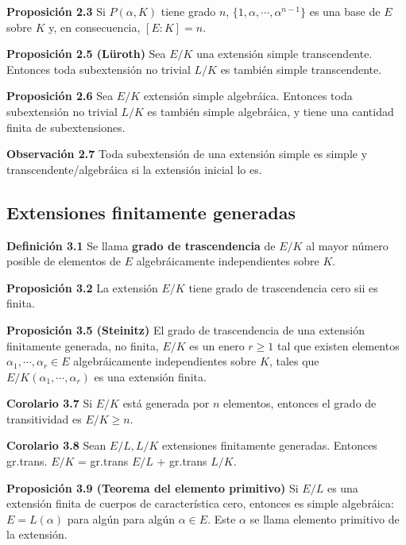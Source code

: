 \documentclass[a4paper, 11pt]{extarticle}
\newcommand{\propo}[1]{\textcolor{rojo}{\textbf{Proposición #1}}}
\newcommand{\defi}[1]{\textcolor{azul}{\textbf{Definición #1}}}
\newcommand{\obs}[1]{\textcolor{verde}{\textbf{Observación #1}}}
\newcommand{\cor}[1]{\textcolor{rosa}{\textbf{Corolario #1}}}
\begin{document}
\begin{multicols*}{2}
\propo{2.3} Si \(P(\alpha,K)\) tiene grado \(n\), \(\{ 1, \alpha, \cdots,
\alpha^{n-1} \}\) es una base de \(E\) sobre \(K\) y, en consecuencia, \([E:K] = n\).

\propo{2.5 (Lüroth)} Sea \(E/K\) una extensión simple transcendente. Entonces
toda subextensión no trivial \(L/K\) es también simple transcendente. 

\propo{2.6} Sea \(E/K\) extensión simple algebráica. Entonces toda
subextensión no trivial \(L/K\) es también simple algebráica, y tiene una
cantidad finita de subextensiones.

\obs{2.7} Toda subextensión de una extensión simple es simple y
transcendente/algebráica si la extensión inicial lo es.

\subsection*{Extensiones finitamente generadas}
\label{sec:orgead2c48}
\defi{3.1} Se llama \textbf{grado de trascendencia} de \(E/K\) al mayor número
posible de elementos de \(E\) algebráicamente independientes sobre \(K\).

\propo{3.2} La extensión \(E/K\) tiene grado de trascendencia cero sii es
finita.

\propo{3.5 (Steinitz)} El grado de trascendencia de una extensión finitamente
generada, no finita, \(E/K\) es un enero \(r \ge 1\) tal que existen
elementos \(\alpha_1, \cdots, \alpha_r \in E\) algebráicamente independientes
sobre \(K\), tales que \(E/K(\alpha_1, \cdots, \alpha_r)\) es una extensión
finita. 

\cor{3.7} Si \(E/K\) está generada por \(n\) elementos, entonces el grado de
transitividad es \(E/K \ge n\).

\cor{3.8} Sean \(E/L, L/K\) extensiones finitamente generadas. Entonces
gr.trans. \(E/K\) = gr.trans \(E/L\) + gr.trans \(L/K\).

\propo{3.9 (Teorema del elemento primitivo)} Si \(E/L\) es una extensión
finita de cuerpos de característica cero, entonces es simple algebráica: \(E =
L(\alpha)\) para algún para algún \(\alpha \in E\). Este \(\alpha\) se
llama elemento primitivo de la extensión.



\end{multicols*}
\pagebreak
\end{document}
